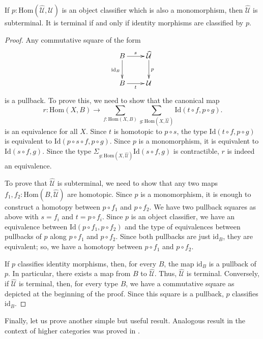 \documentclass[reqno]{amsart}
\theoremstyle{definition}
\theoremstyle{remark}
\newcommand{\fs}[1]{\mathrm{#1}}
\newcommand{\Hom}{\fs{Hom}}
\newcommand{\Id}{\fs{Id}}
\newcommand{\id}{\fs{id}}
\numberwithin{figure}{section}
\begin{document}
\begin{prop}
If $p : \Hom(\widehat{\mathcal{U}},\mathcal{U})$ is an object classifier which is also a monomorphism, then $\widehat{\mathcal{U}}$ is subterminal.
It is terminal if and only if identity morphisms are classified by $p$.
\end{prop}
\begin{proof}
Any commutative square of the form
\[ \xymatrix{ B \ar[r]^s \ar[d]_{\id_B} & \widehat{\mathcal{U}} \ar[d]^p \\
              B \ar[r]_t                & \mathcal{U}
            } \]
is a pullback.
To prove this, we need to show that the canonical map
\[ r : \Hom(X,B) \to \sum_{f : \Hom(X,B)} \sum_{g : \Hom(X,\widehat{\mathcal{U}})} \Id(t \circ f, p \circ g). \]
is an equivalence for all $X$.
Since $t$ is homotopic to $p \circ s$, the type $\Id(t \circ f, p \circ g)$ is equivalent to $\Id(p \circ s \circ f, p \circ g)$.
Since $p$ is a monomorphism, it is equivalent to $\Id(s \circ f, g)$.
Since the type $\Sigma_{g : \Hom(X,\widehat{\mathcal{U}})} \Id(s \circ f, g)$ is contractible, $r$ is indeed an equivalence.

To prove that $\widehat{\mathcal{U}}$ is subterminal, we need to show that any two maps $f_1,f_2 : \Hom(B,\widehat{\mathcal{U}})$ are homotopic.
Since $p$ is a monomorphism, it is enough to construct a homotopy between $p \circ f_1$ and $p \circ f_2$.
We have two pullback squares as above with $s = f_i$ and $t = p \circ f_i$.
Since $p$ is an object classifier, we have an equivalence between $\Id(p \circ f_1, p \circ f_2)$ and the type of equivalences between pullbacks of $p$ along $p \circ f_1$ and $p \circ f_2$.
Since both pullbacks are just $\id_B$, they are equivalent; so, we have a homotopy between $p \circ f_1$ and $p \circ f_2$.

If $p$ classifies identity morphisms, then, for every $B$, the map $\id_B$ is a pullback of $p$.
In particular, there exists a map from $B$ to $\widehat{\mathcal{U}}$.
Thus, $\widehat{\mathcal{U}}$ is terminal.
Conversely, if $\widehat{\mathcal{U}}$ is terminal, then, for every type $B$, we have a commutative square as depicted at the beginning of the proof.
Since this square is a pullback, $p$ classifies $\id_B$.
\end{proof}

Finally, let us prove another simple but useful result.
Analogous result in the context of higher categories was proved in \cite[Theorem~3.28]{rasekh-eht}.
\end{document}
